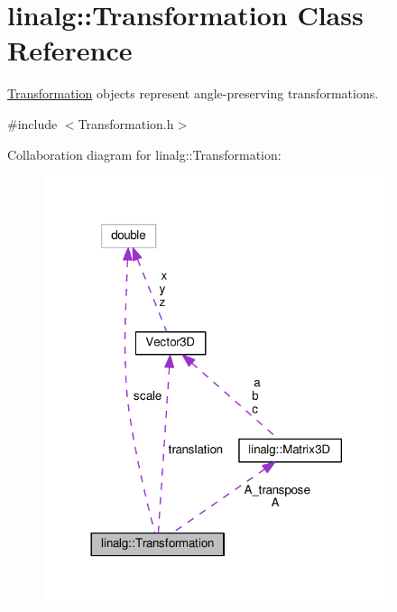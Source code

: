 \hypertarget{classlinalg_1_1Transformation}{}\section{linalg\+:\+:Transformation Class Reference}
\label{classlinalg_1_1Transformation}


\hyperlink{classlinalg_1_1Transformation}{Transformation} objects represent angle-\/preserving transformations.  




{\ttfamily \#include $<$Transformation.\+h$>$}



Collaboration diagram for linalg\+:\+:Transformation\+:\nopagebreak
\begin{figure}[H]
\begin{center}
\leavevmode
\includegraphics[width=288pt]{classlinalg_1_1Transformation__coll__graph}
\end{center}
\end{figure}

